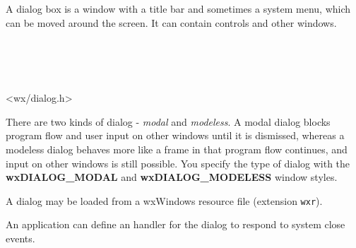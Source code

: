 \section{}\label{wxdialog}

A dialog box is a window with a title bar and sometimes a system menu, which can be moved around
the screen. It can contain controls and other windows.


\\
\\
\\


<wx/dialog.h>


There are two kinds of dialog - {\it modal} and {\it modeless}. A modal dialog
blocks program flow and user input on other windows until it is dismissed, whereas a modeless dialog behaves more
like a frame in that program flow continues, and input on other windows is still possible.
You specify the type of dialog with the {\bf wxDIALOG\_MODAL} and {\bf wxDIALOG\_MODELESS} window
styles.

A dialog may be loaded from a wxWindows resource file (extension {\tt wxr}).

An application can define an  handler for the
dialog to respond to system close events.


\twocolwidtha{5cm}
\begin{twocollist}\itemsep=0pt
\end{twocollist}

